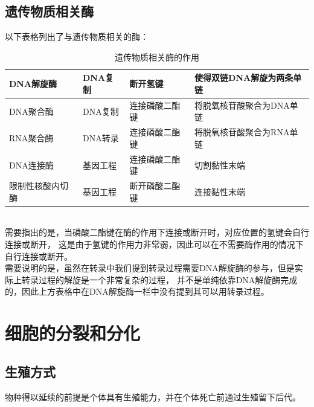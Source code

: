 \documentclass[UTF8]{ctexart}
\begin{document}
\subsection{遗传物质相关酶}
    以下表格列出了与遗传物质相关的酶：
    \begin{table}[h]
        \begin{center}
            \begin{tabular}{l|l|l|l}
                \hline
                DNA解旋酶\qquad\qquad&DNA复制&断开氢键\qquad\qquad&使得双链DNA解旋为两条单链\qquad\qquad\\ \hline
                DNA聚合酶\qquad\qquad&DNA复制&连接磷酸二酯键\qquad\qquad&将脱氧核苷酸聚合为DNA单链\\ \hline
                RNA聚合酶\qquad\qquad&DNA转录&连接磷酸二酯键\qquad\qquad&将脱氧核苷酸聚合为RNA单链\\ \hline
                DNA连接酶\qquad\qquad&基因工程&连接磷酸二酯键\qquad\qquad&切割黏性末端\\ \hline
                限制性核酸内切酶\qquad\qquad&基因工程&断开磷酸二酯键\qquad\qquad&连接黏性末端\\ \hline
            \end{tabular}
            \caption{遗传物质相关酶的作用}
        \end{center}
    \end{table}\\
    需要指出的是，当磷酸二酯键在酶的作用下连接或断开时，对应位置的氢键会自行连接或断开，
    这是由于氢键的作用力非常弱，因此可以在不需要酶作用的情况下自行连接或断开。\\[3mm]
    需要说明的是，虽然在转录中我们提到转录过程需要DNA解旋酶的参与，但是实际上转录过程的解旋是一个非常复杂的过程，
    并不是单纯依靠DNA解旋酶完成的，因此上方表格中在DNA解旋酶一栏中没有提到其可以用转录过程。

\newpage

\section{细胞的分裂和分化}

\subsection{生殖方式}
    物种得以延续的前提是个体具有生殖能力，并在个体死亡前通过生殖留下后代。
\end{document}
